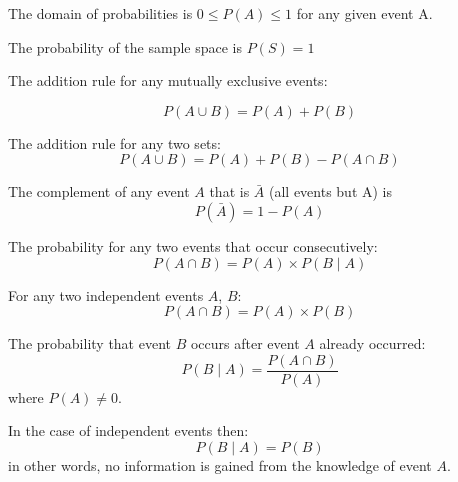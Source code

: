 \documentclass[11pt]{article}
\begin{document}
The domain of probabilities is $0 \leq P(A) \leq 1$ for any given event A.

The probability of the sample space is $P(S) = 1$

\begin{definition}\label{def:addition-rule}
    The addition rule for any mutually exclusive events:
    
    \begin{equation*}
        P (A \cup B) = P (A) + P(B)
    \end{equation*}

    The addition rule for any two sets:
    \begin{equation*}
        P (A \cup B) = P (A) + P(B) - P(A \cap B)
    \end{equation*}
\end{definition}

\begin{definition}\label{def:complement-rule}
    The complement of any event $A$ that is $\bar{A}$ (all events but A) is
    \begin{equation*}
        P(\bar{A}) = 1 - P(A)
    \end{equation*}
\end{definition}

\begin{definition}\label{def:multiplication-rule}
    The probability for any two events that occur consecutively:
    \begin{equation*}
        P (A \cap B) = P(A) \times P(B \mid A)
    \end{equation*}

    For any two independent events $A$, $B$:
    \begin{equation*}
        P (A \cap B) = P(A) \times P(B)
    \end{equation*}
\end{definition}

\begin{definition}\label{def:conditional-probability}
    The probability that event $B$ occurs after event $A$ already occurred:
    \begin{equation*}
        P (B \mid A) = \frac{P(A \cap B)}{P(A)}
    \end{equation*}
    where $P(A) \neq 0$.

    In the case of independent events then:
    \begin{equation*}
        P (B \mid A) = P(B)
    \end{equation*}
    in other words, no information is gained from the knowledge of event $A$.
\end{definition}
\end{document}
